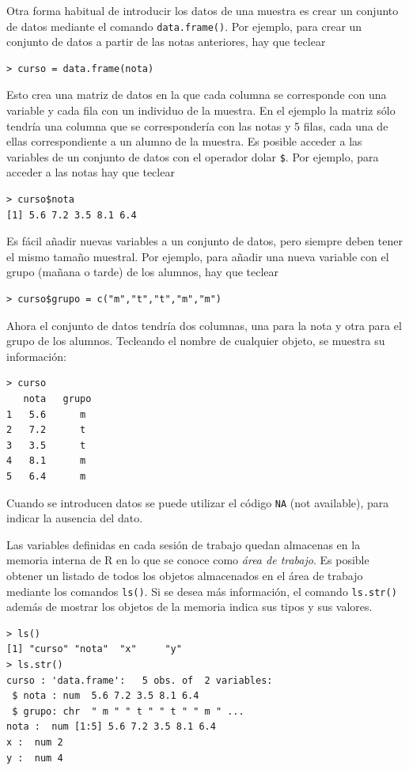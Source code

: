 Otra forma habitual de introducir los datos de una muestra es crear un conjunto de datos mediante el comando
\lstinline{data.frame()}. Por ejemplo, para crear un conjunto de datos a partir de las notas anteriores, hay que teclear
\begin{lstlisting}
> curso = data.frame(nota)
\end{lstlisting}
Esto crea una matriz de datos en la que cada columna se corresponde con una variable y cada fila con un individuo de la
muestra. En el ejemplo la matriz  sólo tendría una columna que se correspondería con las notas y 5
filas, cada una de ellas correspondiente a un alumno de la muestra. Es posible acceder a las variables de un conjunto de
datos con el operador dolar \lstinline{$}. Por ejemplo, para acceder a las notas hay que teclear
\begin{lstlisting}
> curso$nota
[1] 5.6 7.2 3.5 8.1 6.4
\end{lstlisting}
Es fácil añadir nuevas variables a un conjunto de datos, pero siempre deben tener el mismo tamaño muestral. Por ejemplo,
para añadir una nueva variable con el grupo (mañana o tarde) de los alumnos, hay que teclear
\begin{lstlisting}
> curso$grupo = c("m","t","t","m","m")
\end{lstlisting}
Ahora el conjunto de datos  tendría dos columnas, una para la nota y otra para el grupo de los alumnos.
Tecleando el nombre de cualquier objeto, se muestra su información:
\begin{lstlisting}
> curso
   nota   grupo
1   5.6      m
2   7.2      t
3   3.5      t
4   8.1      m
5   6.4      m
\end{lstlisting}

Cuando se introducen datos se puede utilizar el código \lstinline{NA} (not available), para indicar la ausencia del
dato.

Las variables definidas en cada sesión de trabajo quedan almacenas en la memoria interna de R en lo que se conoce como
\emph{área de trabajo}.
Es posible obtener un listado de todos los objetos almacenados en el área de trabajo mediante los comandos
\lstinline{ls()}.
Si se desea más información, el comando \lstinline{ls.str()} además de mostrar los objetos de la memoria indica sus
tipos y sus valores.
\begin{lstlisting}
> ls()
[1] "curso" "nota"  "x"     "y"    
> ls.str()
curso : 'data.frame':   5 obs. of  2 variables:
 $ nota : num  5.6 7.2 3.5 8.1 6.4
 $ grupo: chr  " m " " t " " t " " m " ...
nota :  num [1:5] 5.6 7.2 3.5 8.1 6.4
x :  num 2
y :  num 4
\end{lstlisting}

